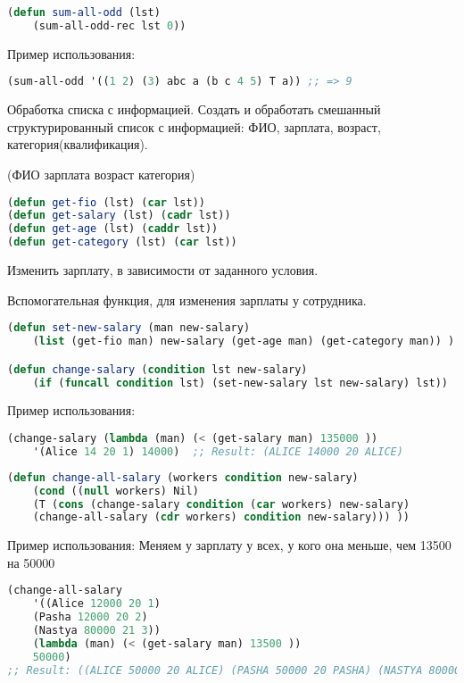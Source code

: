 \documentclass[a4paper,oneside,12pt]{extreport}
\begin{document}
\begin{task}
\begin{lstlisting}[language=Lisp]
(defun sum-all-odd (lst)
    (sum-all-odd-rec lst 0))
    \end{lstlisting}

    Пример использования:
    \begin{lstlisting}[language=Lisp] 
(sum-all-odd '((1 2) (3) abc a (b c 4 5) T a)) ;; => 9
    \end{lstlisting}


\end{task}

\begin{task}
    Обработка списка с информацией.
    Создать и обработать смешанный структурированный список с информацией:
    ФИО, зарплата, возраст, категория(квалификация).

    (ФИО зарплата возраст категория)
    \begin{lstlisting}[language=Lisp]
(defun get-fio (lst) (car lst))
(defun get-salary (lst) (cadr lst))
(defun get-age (lst) (caddr lst))
(defun get-category (lst) (car lst))
    \end{lstlisting}

    Изменить зарплату, в зависимости от заданного условия.
    
    Вспомогательная функция, для изменения зарплаты у сотрудника.
    \begin{lstlisting}[language=Lisp] 
(defun set-new-salary (man new-salary)
    (list (get-fio man) new-salary (get-age man) (get-category man)) )

(defun change-salary (condition lst new-salary)
    (if (funcall condition lst) (set-new-salary lst new-salary) lst))
    \end{lstlisting}

    Пример использования:
    \begin{lstlisting}[language=Lisp] 
(change-salary (lambda (man) (< (get-salary man) 135000 ))
    '(Alice 14 20 1) 14000)  ;; Result: (ALICE 14000 20 ALICE)
    \end{lstlisting}

    \begin{lstlisting}[language=Lisp] 
(defun change-all-salary (workers condition new-salary)
    (cond ((null workers) Nil)
    (T (cons (change-salary condition (car workers) new-salary)
    (change-all-salary (cdr workers) condition new-salary))) ))    
    \end{lstlisting}

    Пример использования:
    Меняем у зарплату у всех, у кого она меньше, чем 13500 на 50000
    \begin{lstlisting}[language=Lisp] 
(change-all-salary 
	'((Alice 12000 20 1)
	(Pasha 12000 20 2)
	(Nastya 80000 21 3))
	(lambda (man) (< (get-salary man) 13500 ))
	50000)
;; Result: ((ALICE 50000 20 ALICE) (PASHA 50000 20 PASHA) (NASTYA 80000 21 3))
    \end{lstlisting}


\end{task}
\end{document}
